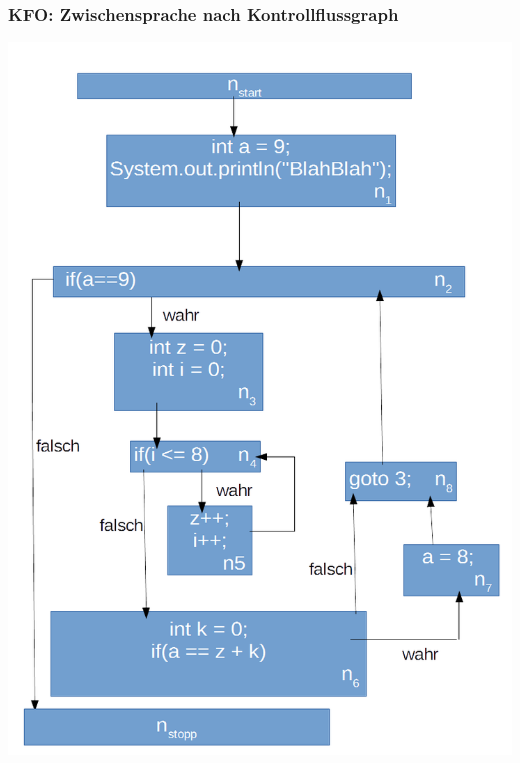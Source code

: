 \documentclass[18pt]{beamer}
\begin{document}
	\begin{frame}
		\frametitle{KFO: Zwischensprache nach Kontrollflussgraph}
		\centering \includegraphics[scale=0.25]{./pics/tut5/test.png}
	\end{frame}
\end{document}
